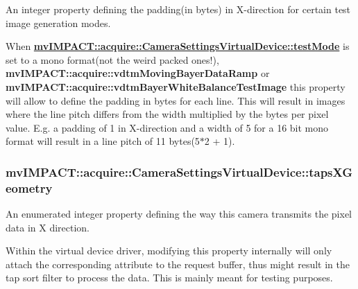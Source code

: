 An integer property defining the padding(in bytes) in X-\/direction for certain test image generation modes. 

When {\bfseries \hyperlink{classmv_i_m_p_a_c_t_1_1acquire_1_1_camera_settings_virtual_device_a804a5ef868aaf896d39986547d8407f6}{mv\+I\+M\+P\+A\+C\+T\+::acquire\+::\+Camera\+Settings\+Virtual\+Device\+::test\+Mode}} is set to a mono format(not the weird packed ones!), {\bfseries mv\+I\+M\+P\+A\+C\+T\+::acquire\+::vdtm\+Moving\+Bayer\+Data\+Ramp} or {\bfseries mv\+I\+M\+P\+A\+C\+T\+::acquire\+::vdtm\+Bayer\+White\+Balance\+Test\+Image} this property will allow to define the padding in bytes for each line. This will result in images where the line pitch differs from the width multiplied by the bytes per pixel value. E.\+g. a padding of 1 in X-\/direction and a width of 5 for a 16 bit mono format will result in a line pitch of 11 bytes(5$\ast$2 + 1). \hypertarget{classmv_i_m_p_a_c_t_1_1acquire_1_1_camera_settings_virtual_device_a0bbf2c1250572ec75184d9a56fc12de2}{
\subsubsection[{taps\+X\+Geometry}]{ mv\+I\+M\+P\+A\+C\+T\+::acquire\+::\+Camera\+Settings\+Virtual\+Device\+::taps\+X\+Geometry}}\label{classmv_i_m_p_a_c_t_1_1acquire_1_1_camera_settings_virtual_device_a0bbf2c1250572ec75184d9a56fc12de2}


An enumerated integer property defining the way this camera transmits the pixel data in X direction. 

Within the virtual device driver, modifying this property internally will only attach the corresponding attribute to the request buffer, thus might result in the tap sort filter to process the data. This is mainly meant for testing purposes.

